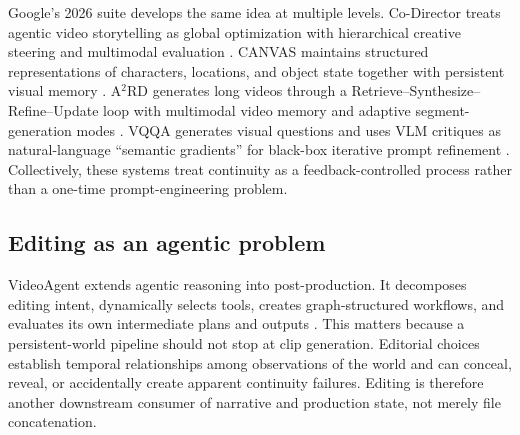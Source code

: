 \documentclass{article}
\begin{document}
Google's 2026 suite develops the same idea at multiple levels. Co-Director treats agentic video storytelling as global optimization with hierarchical creative steering and multimodal evaluation \citep{song2026codirector}. CANVAS maintains structured representations of characters, locations, and object state together with persistent visual memory \citep{mondal2026canvas}. A$^2$RD generates long videos through a Retrieve--Synthesize--Refine--Update loop with multimodal video memory and adaptive segment-generation modes \citep{long2026a2rd}. VQQA generates visual questions and uses VLM critiques as natural-language “semantic gradients” for black-box iterative prompt refinement \citep{song2026vqqa}. Collectively, these systems treat continuity as a feedback-controlled process rather than a one-time prompt-engineering problem.

\subsection{Editing as an agentic problem}

VideoAgent extends agentic reasoning into post-production. It decomposes editing intent, dynamically selects tools, creates graph-structured workflows, and evaluates its own intermediate plans and outputs \citep{zhou2026videoagent}. This matters because a persistent-world pipeline should not stop at clip generation. Editorial choices establish temporal relationships among observations of the world and can conceal, reveal, or accidentally create apparent continuity failures. Editing is therefore another downstream consumer of narrative and production state, not merely file concatenation.
\end{document}
